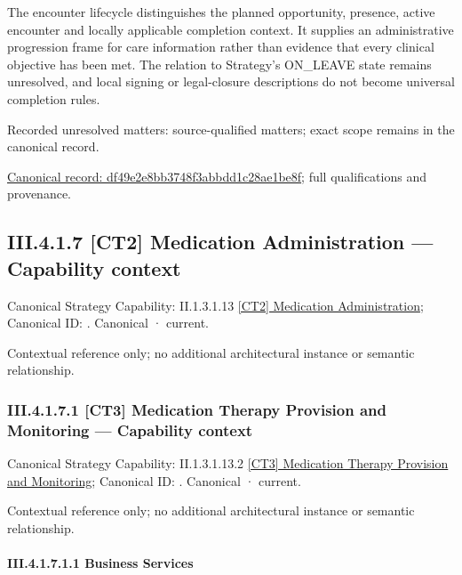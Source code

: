 The encounter lifecycle distinguishes the planned opportunity, presence, active encounter and locally applicable completion context. It supplies an administrative progression frame for care information rather than evidence that every clinical objective has been met. The relation to Strategy's ON\_LEAVE state remains unresolved, and local signing or legal-closure descriptions do not become universal completion rules.


{\small Recorded unresolved matters: source-qualified matters; exact scope remains in the canonical record.}\par
{\footnotesize \href{../../../../continuum/business/business-process/df49e2e8bb3748f3abbdd1c28ae1be8f.md}{Canonical record: df49e2e8bb3748f3abbdd1c28ae1be8f}; full qualifications and provenance.}\par
\subsection*{III.4.1.7 [CT2] Medication Administration — Capability context}
\label{navigation:III.4.1.7}

{\small Canonical Strategy Capability: II.1.3.1.13 \hyperref[element:c907e2a95629435b9951941ad4e2ebe9]{[CT2] Medication Administration}; Canonical ID: \texttt{}. Canonical · current.}\par
Contextual reference only; no additional architectural instance or semantic relationship.\par
\subsubsection*{III.4.1.7.1 [CT3] Medication Therapy Provision and Monitoring — Capability context}
\label{navigation:III.4.1.7.1}

{\small Canonical Strategy Capability: II.1.3.1.13.2 \hyperref[element:d1821b4f6d5746f9a697dfe3b792a186]{[CT3] Medication Therapy Provision and Monitoring}; Canonical ID: \texttt{}. Canonical · current.}\par
Contextual reference only; no additional architectural instance or semantic relationship.\par
\paragraph*{III.4.1.7.1.1 Business Services}
\label{navigation:III.4.1.7.1.1}

